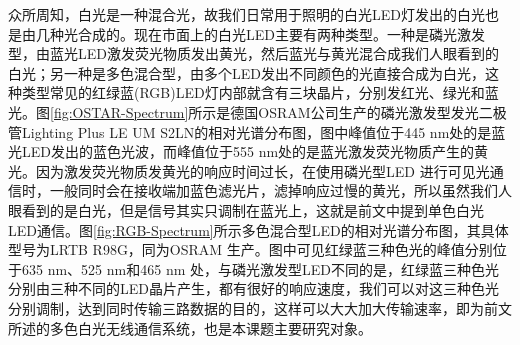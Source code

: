 众所周知，白光是一种混合光，故我们日常用于照明的白光LED灯发出的白光也是由几种光合成的。现在市面上的白光LED主要有两种类型。一种是磷光激发型，由蓝光LED激发荧光物质发出黄光，然后蓝光与黄光混合成我们人眼看到的白光；另一种是多色混合型，由多个LED发出不同颜色的光直接合成为白光，这种类型常见的红绿蓝(RGB)LED灯内部就含有三块晶片，分别发红光、绿光和蓝光。图\ref{fig:OSTAR-Spectrum}所示是德国OSRAM公司生产的磷光激发型发光二极管Lighting Plus LE UM S2LN的相对光谱分布图\cite{LE2011}，图中峰值位于445 nm处的是蓝光LED发出的蓝色光波，而峰值位于555 nm处的是蓝光激发荧光物质产生的黄光。因为激发荧光物质发黄光的响应时间过长，在使用磷光型LED 进行可见光通信时，一般同时会在接收端加蓝色滤光片，滤掉响应过慢的黄光，所以虽然我们人眼看到的是白光，但是信号其实只调制在蓝光上，这就是前文中提到单色白光LED通信。图\ref{fig:RGB-Spectrum}所示多色混合型LED的相对光谱分布图\citep{LRTB2011}，其具体型号为LRTB R98G，同为OSRAM 生产。图中可见红绿蓝三种色光的峰值分别位于635 nm、525 nm和465 nm 处，与磷光激发型LED不同的是，红绿蓝三种色光分别由三种不同的LED晶片产生，都有很好的响应速度，我们可以对这三种色光分别调制，达到同时传输三路数据的目的，这样可以大大加大传输速率，即为前文所述的多色白光无线通信系统，也是本课题主要研究对象。


